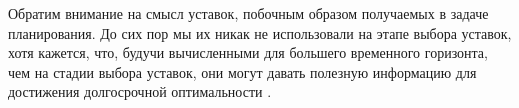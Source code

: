     
    
    
    
    Обратим внимание на смысл уставок, побочным образом получаемых в задаче планирования. 
    До сих пор мы их никак не использовали на этапе выбора уставок,  хотя кажется, что, будучи вычисленными для большего временного горизонта, чем на стадии выбора уставок, они могут давать полезную информацию для достижения долгосрочной оптимальности .
    

